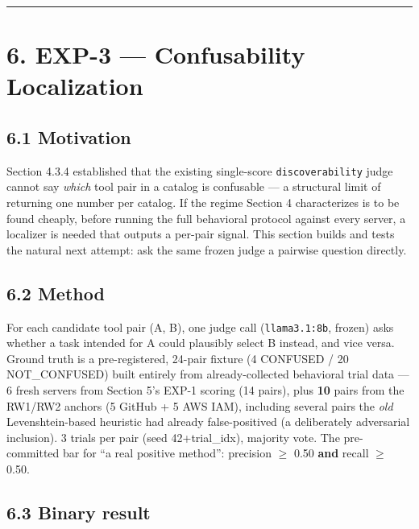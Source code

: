 \begin{center}\rule{0.5\linewidth}{0.5pt}\end{center}

\hypertarget{exp-3-confusability-localization}{%
\section{6. EXP-3 --- Confusability
Localization}\label{exp-3-confusability-localization}}

\hypertarget{motivation}{%
\subsection{6.1 Motivation}\label{motivation}}

Section 4.3.4 established that the existing single-score
\texttt{discoverability} judge cannot say \emph{which} tool pair in a
catalog is confusable --- a structural limit of returning one number per
catalog. If the regime Section 4 characterizes is to be found cheaply,
before running the full behavioral protocol against every server, a
localizer is needed that outputs a per-pair signal. This section builds
and tests the natural next attempt: ask the same frozen judge a pairwise
question directly.

\hypertarget{method}{%
\subsection{6.2 Method}\label{method}}

For each candidate tool pair (A, B), one judge call
(\texttt{llama3.1:8b}, frozen) asks whether a task intended for A could
plausibly select B instead, and vice versa. Ground truth is a
pre-registered, 24-pair fixture (4 CONFUSED / 20 NOT\_CONFUSED) built
entirely from already-collected behavioral trial data --- 6 fresh
servers from Section 5's EXP-1 scoring (14 pairs), plus \textbf{10}
pairs from the RW1/RW2 anchors (5 GitHub + 5 AWS IAM), including several
pairs the \emph{old} Levenshtein-based heuristic had already
false-positived (a deliberately adversarial inclusion). 3 trials per
pair (seed 42+trial\_idx), majority vote. The pre-committed bar for ``a
real positive method'': precision $\geq$ 0.50 \textbf{and} recall $\geq$ 0.50.

\hypertarget{binary-result}{%
\subsection{6.3 Binary result}\label{binary-result}}

